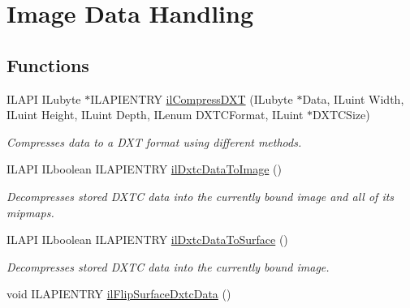 \hypertarget{group__data}{\section{Image Data Handling}
\label{group__data}
}
\subsection*{Functions}
\begin{DoxyCompactItemize}
\item 
I\-L\-A\-P\-I I\-Lubyte $\ast$I\-L\-A\-P\-I\-E\-N\-T\-R\-Y \hyperlink{group__data_ga016b03ccbf86f6ba37d6c24b3357f9d1}{il\-Compress\-D\-X\-T} (I\-Lubyte $\ast$Data, I\-Luint Width, I\-Luint Height, I\-Luint Depth, I\-Lenum D\-X\-T\-C\-Format, I\-Luint $\ast$D\-X\-T\-C\-Size)
\begin{DoxyCompactList}\small\item\em Compresses data to a D\-X\-T format using different methods. \end{DoxyCompactList}\item 
\hypertarget{group__data_ga8faac0b5b4f410b903b1bc4b825fc345}{I\-L\-A\-P\-I I\-Lboolean I\-L\-A\-P\-I\-E\-N\-T\-R\-Y \hyperlink{group__data_ga8faac0b5b4f410b903b1bc4b825fc345}{il\-Dxtc\-Data\-To\-Image} ()}\label{group__data_ga8faac0b5b4f410b903b1bc4b825fc345}

\begin{DoxyCompactList}\small\item\em Decompresses stored D\-X\-T\-C data into the currently bound image and all of its mipmaps. \end{DoxyCompactList}\item 
\hypertarget{group__data_ga1357342a2f78514311614044bc6adee2}{I\-L\-A\-P\-I I\-Lboolean I\-L\-A\-P\-I\-E\-N\-T\-R\-Y \hyperlink{group__data_ga1357342a2f78514311614044bc6adee2}{il\-Dxtc\-Data\-To\-Surface} ()}\label{group__data_ga1357342a2f78514311614044bc6adee2}

\begin{DoxyCompactList}\small\item\em Decompresses stored D\-X\-T\-C data into the currently bound image. \end{DoxyCompactList}\item 
\hypertarget{group__data_ga275bf97933de4ca996bcceeee3a58621}{void I\-L\-A\-P\-I\-E\-N\-T\-R\-Y \hyperlink{group__data_ga275bf97933de4ca996bcceeee3a58621}{il\-Flip\-Surface\-Dxtc\-Data} ()}\label{group__data_ga275bf97933de4ca996bcceeee3a58621}


\end{DoxyCompactItemize}
